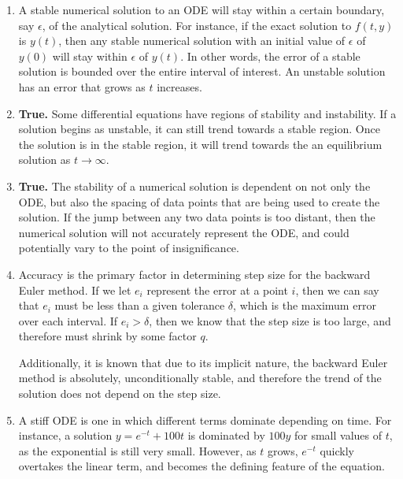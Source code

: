 \documentclass[11pt]{article}
\begin{document}
\begin{enumerate}
\begin{enumerate}
		\medskip

		\item A stable numerical solution to an ODE will stay within a certain boundary, say $\epsilon$, of the analytical solution. For instance, if the exact solution to $f(t,y)$ is $y(t)$, then any stable numerical solution with an initial value of $\epsilon$ of $y(0)$ will stay within $\epsilon$ of $y(t)$. In other words, the error of a stable solution is bounded over the entire interval of interest. An unstable solution has an error that grows as $t$ increases.

		\medskip

		\item \textbf{True.} Some differential equations have regions of stability and instability. If a solution begins as unstable, it can still trend towards a stable region. Once the solution is in the stable region, it will trend towards the an equilibrium solution as $t\to\infty$.

		\medskip

		\item \textbf{True.} The stability of a numerical solution is dependent on not only the ODE, but also the spacing of data points that are being used to create the solution. If the jump between any two data points is too distant, then the numerical solution will not accurately represent the ODE, and could potentially vary to the point of insignificance.

		\medskip

		\item Accuracy is the primary factor in determining step size for the backward Euler method. If we let $e_i$ represent the error at a point $i$, then we can say that $e_i$ must be less than a given tolerance $\delta$, which is the maximum error over each interval. If $e_i > \delta$, then we know that the step size is too large, and therefore must shrink by some factor $q$.

		Additionally, it is known that due to its implicit nature, the backward Euler method is absolutely, unconditionally stable, and therefore the trend of the solution does not depend on the step size.

		\medskip

		\item A stiff ODE is one in which different terms dominate depending on time. For instance, a solution $y=e^{-t} + 100t$ is dominated by $100y$ for small values of $t$, as the exponential is still very small. However, as $t$ grows, $e^{-t}$ quickly overtakes the linear term, and becomes the defining feature of the equation.


\end{enumerate}
\end{enumerate}
\end{document}

